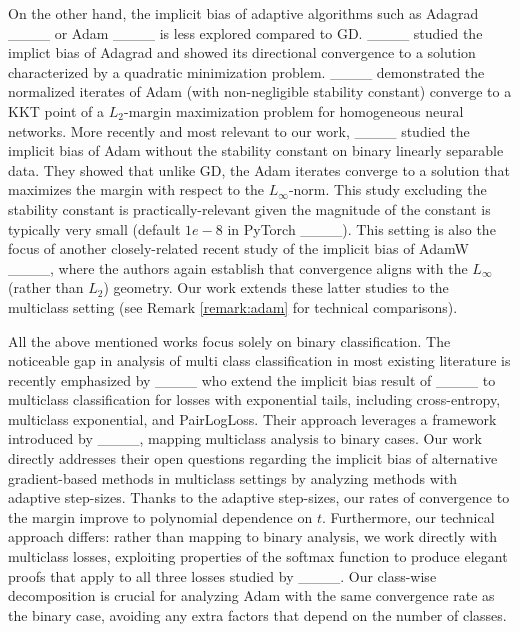On the other hand, the implicit bias of adaptive algorithms such as Adagrad ____ or Adam ____ is less explored compared to GD. ____ studied the implict bias of Adagrad and showed its directional convergence to a solution characterized by a quadratic minimization problem. ____ demonstrated the normalized iterates of Adam (with non-negligible stability constant) converge to a KKT point of a $L_2$-margin maximization problem for homogeneous neural networks. More recently and most relevant to our work, ____ studied the implicit bias of Adam without the stability constant on binary linearly separable data. They showed that unlike GD, the Adam iterates converge to a solution that maximizes the margin with respect to the $L_{\infty}$-norm. 
This study excluding the stability constant is practically-relevant given the magnitude of the constant is typically very small (default $1e-8$ in PyTorch ____). This setting is also the focus of another closely-related  recent study of the implicit bias of AdamW ____, where the authors again establish that convergence aligns with the $L_{\infty}$ (rather than $L_{2}$) geometry. Our work extends these latter studies to the multiclass setting
(see Remark \ref{remark:adam} for technical comparisons).

All the above mentioned works focus solely on binary classification. The noticeable gap in analysis of multi class classification in most existing literature is  recently emphasized by ____ who extend the implicit bias result of ____ to multiclass classification for losses with exponential tails, including cross-entropy, multiclass exponential, and PairLogLoss. Their approach leverages a framework introduced by ____, mapping multiclass analysis to binary cases. Our work directly addresses their open questions regarding the implicit bias of alternative gradient-based methods in multiclass settings by analyzing methods with adaptive step-sizes. Thanks to the adaptive step-sizes, our rates of convergence to the margin improve to polynomial dependence on $t$. Furthermore, our technical approach differs: rather than mapping to binary analysis, we work directly with multiclass losses, exploiting properties of the softmax function to produce elegant proofs that apply to all three losses studied by ____. Our class-wise decomposition is crucial for analyzing Adam with the same convergence rate as the binary case, avoiding any extra factors that depend on the number of classes.

